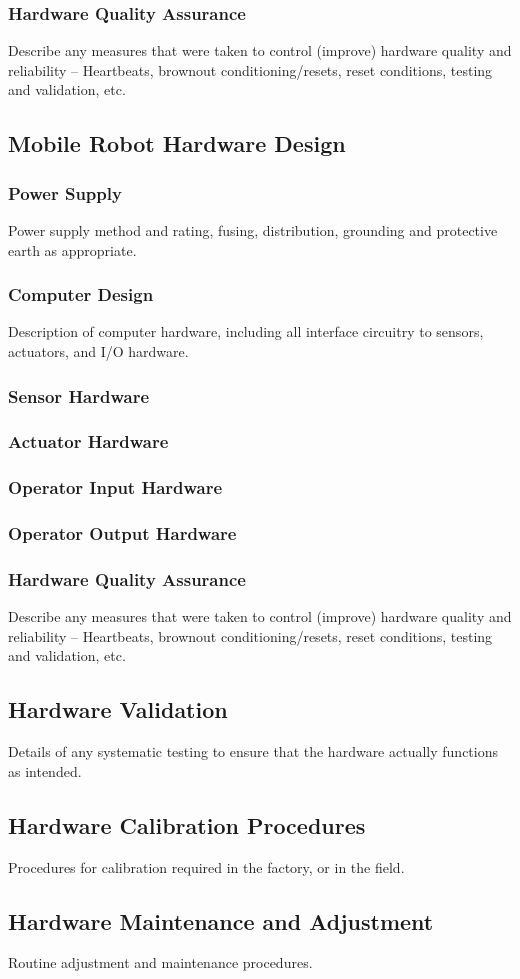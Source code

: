 \documentclass[MTRX3700report.tex]{subfiles}
\begin{document}
    \subsubsection{Hardware Quality Assurance}
    Describe any measures that were taken to control (improve) hardware quality and reliability – Heartbeats, brownout conditioning/resets, reset conditions, testing and validation, etc.
    
  \subsection{Mobile Robot Hardware Design}
    \subsubsection{Power Supply}
    Power supply method and rating, fusing, distribution, grounding and protective earth as appropriate.
    \subsubsection{Computer Design}
    Description of computer hardware, including all interface circuitry to sensors, actuators, and I/O hardware.
    \subsubsection{Sensor Hardware}
    \subsubsection{Actuator Hardware}
    \subsubsection{Operator Input Hardware}
    \subsubsection{Operator Output Hardware}
    \subsubsection{Hardware Quality Assurance}
    Describe any measures that were taken to control (improve) hardware quality and reliability – Heartbeats, brownout conditioning/resets, reset conditions, testing and validation, etc.


  \subsection{Hardware Validation}
  Details of any systematic testing to ensure that the hardware actually functions as intended.
  \subsection{Hardware Calibration Procedures}
  Procedures for calibration required in the factory, or in the field.
  \subsection{Hardware Maintenance and Adjustment}
  Routine adjustment and maintenance procedures.
\end{document}
